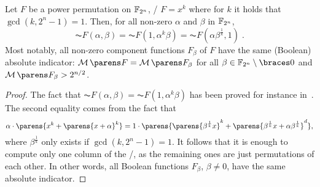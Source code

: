 \begin{corollary}
    Let $F$ be a power permutation on $\mathbb{F}_{2^n}$, \ie/ $F = x^k$ where for $k$ it holds that $\gcd(k, 2^n-1)=1$.
    Then, for all non-zero $\alpha$ and $\beta$ in $\mathbb{F}_{2^n}$,
    \begin{equation*}
        \AC{F}(\alpha, \beta) = \AC{F}(1, \alpha^k \beta) = \AC{F}(\alpha \beta^{\frac{1}{k}}, 1)\;.
    \end{equation*}
    Most notably, all non-zero component functions $F_\beta$ of $F$ have the same (Boolean) absolute indicator: $\absoluteindicator{F} = \absoluteindicator{F_\beta}$ for all $\beta \in \F_{2^n} \setminus \set{0}$ and $\absoluteindicator{F_\beta} > 2^{n/2}$.
\end{corollary}
\begin{proof}
    The fact that $\AC{F}(\alpha, \beta) = \AC{F}(1, \alpha^k \beta)$ has been proved for instance in~\cite[Proposition~4]{TIT:BCCL06}.
    The second equality comes from the fact that
    \begin{equation*}
        \alpha \cdot \parens{x^k + \parens{x+\alpha}^k} = 1 \cdot \parens{\parens{\beta^{\frac{1}{k}}x}^k + \parens{\beta^{\frac{1}{k}}x + \alpha \beta^{\frac{1}{k}}}^d},
    \end{equation*}
    where $\beta^{\frac{1}{k}}$ only exists if $\gcd(k, 2^n-1) = 1$.
    It follows that it is enough to compute only one column of the \ACT/, as the remaining ones are just permutations of each other.
    In other words, all Boolean functions $F_\beta$, $\beta \neq 0$, have the same absolute indicator.
\end{proof}

